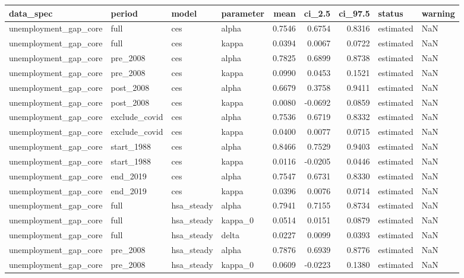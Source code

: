\begin{tabular}{llllrrrll}
\toprule
data\_spec & period & model & parameter & mean & ci\_2.5 & ci\_97.5 & status & warning \\
\midrule
unemployment\_gap\_core & full & ces & alpha & 0.7546 & 0.6754 & 0.8316 & estimated & NaN \\
unemployment\_gap\_core & full & ces & kappa & 0.0394 & 0.0067 & 0.0722 & estimated & NaN \\
unemployment\_gap\_core & pre\_2008 & ces & alpha & 0.7825 & 0.6899 & 0.8738 & estimated & NaN \\
unemployment\_gap\_core & pre\_2008 & ces & kappa & 0.0990 & 0.0453 & 0.1521 & estimated & NaN \\
unemployment\_gap\_core & post\_2008 & ces & alpha & 0.6679 & 0.3758 & 0.9411 & estimated & NaN \\
unemployment\_gap\_core & post\_2008 & ces & kappa & 0.0080 & -0.0692 & 0.0859 & estimated & NaN \\
unemployment\_gap\_core & exclude\_covid & ces & alpha & 0.7536 & 0.6719 & 0.8332 & estimated & NaN \\
unemployment\_gap\_core & exclude\_covid & ces & kappa & 0.0400 & 0.0077 & 0.0715 & estimated & NaN \\
unemployment\_gap\_core & start\_1988 & ces & alpha & 0.8466 & 0.7529 & 0.9403 & estimated & NaN \\
unemployment\_gap\_core & start\_1988 & ces & kappa & 0.0116 & -0.0205 & 0.0446 & estimated & NaN \\
unemployment\_gap\_core & end\_2019 & ces & alpha & 0.7547 & 0.6731 & 0.8330 & estimated & NaN \\
unemployment\_gap\_core & end\_2019 & ces & kappa & 0.0396 & 0.0076 & 0.0714 & estimated & NaN \\
unemployment\_gap\_core & full & hsa\_steady & alpha & 0.7941 & 0.7155 & 0.8734 & estimated & NaN \\
unemployment\_gap\_core & full & hsa\_steady & kappa\_0 & 0.0514 & 0.0151 & 0.0879 & estimated & NaN \\
unemployment\_gap\_core & full & hsa\_steady & delta & 0.0227 & 0.0099 & 0.0393 & estimated & NaN \\
unemployment\_gap\_core & pre\_2008 & hsa\_steady & alpha & 0.7876 & 0.6939 & 0.8776 & estimated & NaN \\
unemployment\_gap\_core & pre\_2008 & hsa\_steady & kappa\_0 & 0.0609 & -0.0223 & 0.1380 & estimated & NaN \\

\end{tabular}
